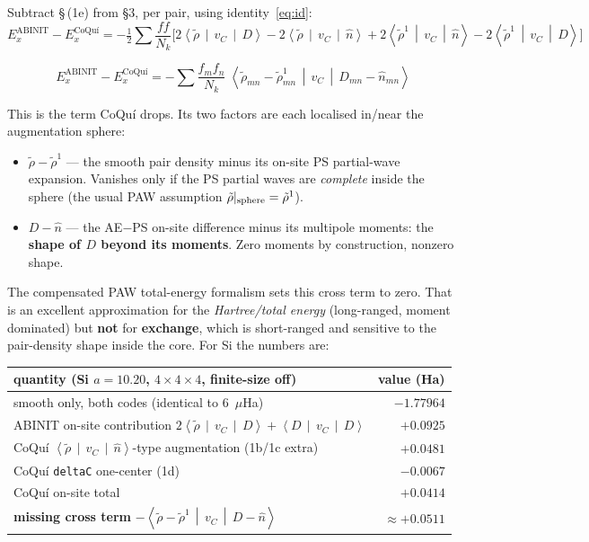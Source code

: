 \documentclass[11pt]{article}
\newcommand{\rt}{\tilde{\rho}}
\newcommand{\vc}{v_C}
\newcommand{\avg}[3]{\left\langle #1 \,\middle|\, #2 \,\middle|\, #3 \right\rangle}
\newcommand{\code}[1]{\texttt{\small #1}}
\begin{document}
Subtract \S\,(1e) from \S3, per pair, using identity~\eqref{eq:id}:
\begin{equation}
E^{\text{ABINIT}}_x - E^{\text{CoQu\'i}}_x
= -\tfrac12\sum\frac{ff}{N_k}\Big[
   2\avg{\rt}{\vc}{D} - 2\avg{\rt}{\vc}{\hat n}
 + 2\avg{\rt^1}{\vc}{\hat n} - 2\avg{\rt^1}{\vc}{D} \Big]
\end{equation}
\begin{keybox}
\vspace{-2pt}
\begin{equation}
\boxed{\;
E^{\text{ABINIT}}_x - E^{\text{CoQu\'i}}_x
= -\sum \frac{f_m f_n}{N_k}\;
   \avg{\rt_{mn} - \rt^{1}_{mn}}{\vc}{D_{mn} - \hat n_{mn}}
\;}
\end{equation}
\vspace{-10pt}
\end{keybox}

This is the term CoQu\'i drops. Its two factors are each localised in/near the
augmentation sphere:
\begin{itemize}[leftmargin=1.4em]
  \item $\rt - \rt^1$ --- the smooth pair density minus its on-site PS partial-wave
    expansion. Vanishes only if the PS partial waves are \emph{complete} inside the
    sphere (the usual PAW assumption $\rt|_{\rm sphere} = \rt^1$).
  \item $D - \hat n$ --- the AE$-$PS on-site difference minus its multipole moments:
    the \textbf{shape of $D$ beyond its moments}. Zero moments by construction,
    nonzero shape.
\end{itemize}

The compensated PAW total-energy formalism sets this cross term to zero. That is an
excellent approximation for the \emph{Hartree/total energy} (long-ranged, moment
dominated) but \textbf{not} for \textbf{exchange}, which is short-ranged and
sensitive to the pair-density shape inside the core. For Si the numbers are:

\begin{table}[h]
\centering
\begin{tabular}{lr}
\toprule
quantity (Si $a=10.20$, $4\times4\times4$, finite-size off) & value (Ha)\\
\midrule
smooth only, both codes (identical to 6~$\mu$Ha) & $-1.77964$\\
ABINIT on-site contribution $2\avg{\rt}{\vc}{D}+\avg{D}{\vc}{D}$ & $\mathbf{+0.0925}$\\
CoQu\'i $\avg{\rt}{\vc}{\hat n}$-type augmentation (1b/1c extra) & $+0.0481$\\
CoQu\'i \code{deltaC} one-center (1d) & $-0.0067$\\
CoQu\'i on-site total & $\mathbf{+0.0414}$\\
\textbf{missing cross term} $-\avg{\rt-\rt^1}{\vc}{D-\hat n}$ & $\mathbf{\approx +0.0511}$\\
\bottomrule
\end{tabular}
\end{table}
\end{document}
